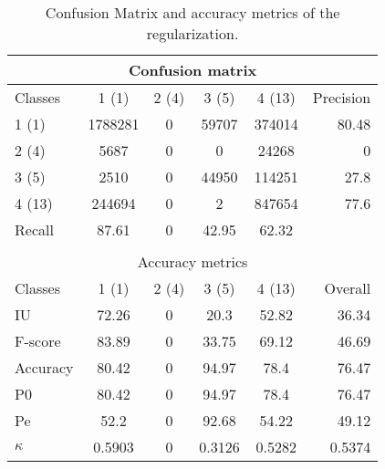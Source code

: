 \begin{table}[htbp]
\begin{center}
\begin{tabular}{|l|c|c|c|c|r|}
\hline
\multicolumn{6}{|c|}{Confusion matrix} \\
\hline
 Classes & 1 (1) & 2 (4) & 3 (5) & 4 (13) & Precision \\
\hline
1 (1) & 1788281 & 0 & 59707 & 374014 & 80.48 \\
\hline
2 (4) & 5687 & 0 & 0 & 24268 & 0 \\
\hline
3 (5) & 2510 & 0 & 44950 & 114251 & 27.8 \\
\hline
4 (13) & 244694 & 0 & 2 & 847654 & 77.6 \\
\hline
Recall & 87.61 & 0 & 42.95 & 62.32 &  \\
\hline
\multicolumn{6}{c}{ } \\
\hline
\multicolumn{6}{|c|}{Accuracy metrics} \\
\hline
 Classes & 1 (1) & 2 (4) & 3 (5) & 4 (13) & Overall \\
\hline
IU & 72.26 & 0 & 20.3 & 52.82 & 36.34 \\
\hline
F-score & 83.89 & 0 & 33.75 & 69.12 & 46.69 \\
\hline
Accuracy & 80.42 & 0 & 94.97 & 78.4 & 76.47 \\
\hline
P0 & 80.42 & 0 & 94.97 & 78.4 & 76.47 \\
\hline
Pe & 52.2 & 0 & 92.68 & 54.22 & 49.12 \\
\hline
$\kappa$ & 0.5903 & 0 & 0.3126 & 0.5282 & 0.5374 \\
\hline
\end{tabular}
\caption{Confusion Matrix and accuracy metrics of the regularization.}
\end{center}
\end{table}